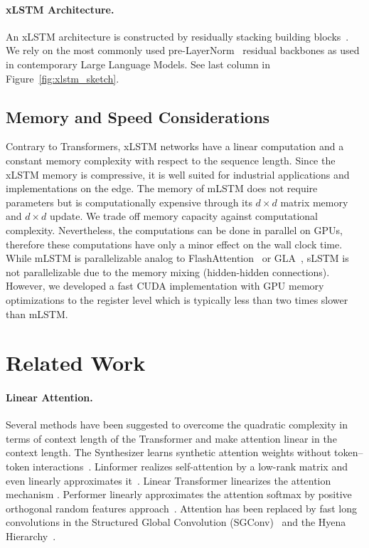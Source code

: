 \documentclass[dvipsnames]{article}
\begin{document}
\paragraph{xLSTM Architecture. }
\label{sec:xLSTMarchitecure}
An xLSTM architecture is constructed by residually stacking building blocks~\citep{Srivastava:15,He:16}. We rely on the most commonly used pre-LayerNorm~\citep{Ba:16b} residual backbones as used in contemporary Large Language Models.
See last column in Figure~\ref{fig:xlstm_sketch}.
\subsection{Memory and Speed Considerations}
Contrary to Transformers, xLSTM networks have a linear
computation and a constant memory complexity
with respect to the sequence length.
Since the xLSTM memory is compressive, it is well suited
for industrial applications and implementations on the edge.
The memory of mLSTM does not require parameters but is
computationally expensive through its $d \times d$ matrix memory
and $d \times d$ update. We trade off memory
capacity against computational complexity.
Nevertheless, the computations can be done in parallel on GPUs, therefore
these computations have only a minor effect on the wall clock time.
While mLSTM is parallelizable
analog to FlashAttention~\citep{Dao:22,Dao:23} or GLA~\citep{Yang:23arxiv},
sLSTM is not parallelizable due to
the memory mixing (hidden-hidden connections).
However, we developed a fast CUDA implementation with
GPU memory optimizations to the register level which is
typically less than two times slower than mLSTM.
\section{Related Work}
\label{sec:related}
\paragraph{Linear Attention.}
Several methods have been suggested to overcome the
quadratic complexity in terms of context length of the Transformer
and make attention linear in the context length.
The Synthesizer learns synthetic attention weights
without token--token interactions~\citep{Tay:20arxiv}.
Linformer realizes self-attention by a low-rank matrix and even
linearly approximates it~\citep{Wang:20arxiv}.
Linear Transformer linearizes the attention mechanism
\citep{Katharopoulos:20}.
Performer linearly approximates the attention softmax by
positive orthogonal random features approach~\citep{Choromanski:21}.
Attention has been replaced by fast long convolutions
in the Structured Global Convolution (SGConv)~\citep{Li:22}
and the Hyena Hierarchy~\citep{Poli:23}.
\end{document}
